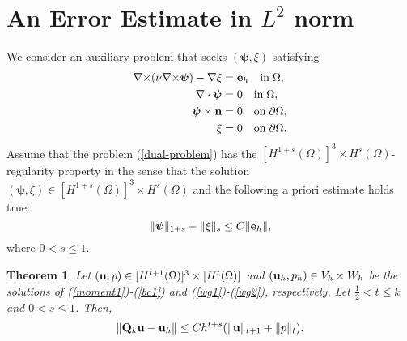 \documentclass[11pt]{amsart}
\newtheorem{theorem}{Theorem}[section]
\newcommand{\bu}{{\bf u}}
\newcommand{\be}{{\bf e}}
\newcommand{\bQ}{{\bf Q}}
\newcommand{\curl}{{\nabla\times}}
\def\bpsi{{\boldsymbol{\psi}}}
\def\bn{{\bf n}}
\begin{document}
\section{An Error Estimate in $L^2$ norm}\label{Section:L2ErrorEstimates}

We consider an auxiliary problem that seeks
$(\bpsi,\xi)$ satisfying
\begin{equation}\label{dual-problem}
\begin{split}
\curl(\nu \curl\bpsi)-\nabla \xi &=\be_h\quad \mbox{in}\;\Omega,\\
\nabla\cdot\bpsi&=0\quad\mbox{in}\;\Omega,\\
\bpsi\times\bn &= 0\quad\mbox{on}\;\partial\Omega,\\
\xi &= 0\quad\mbox{on}\;\partial\Omega.\\
\end{split}
\end{equation}
Assume that the problem (\ref{dual-problem}) has the
$[H^{1+s}(\Omega)]^3\times H^s(\Omega)$-regularity property in the
sense that the solution $(\bpsi, \xi)\in [H^{1+s}(\Omega)]^3\times
H^s(\Omega)$ and the following a priori estimate holds true:
\begin{equation}\label{reg}
\|\bpsi\|_{1+s}+\|\xi\|_s\le C\|\be_h\|,
\end{equation}
where $0< s\le 1$.

\medskip
\begin{theorem} \label{L2-bd}
Let $(\bu, p)\in  [H^{t+1}(\Omega)]^3\times [H^{t}(\Omega)]$ and $(\bu_h,p_h)\in V_h\times W_h$ be the
solutions of (\ref{moment1})-(\ref{bc1}) and (\ref{wg1})-(\ref{wg2}),
respectively. Let $\frac12 <t\le k$ and $0 < s \le 1$. Then,
\begin{equation}\label{l2-error}
\|\bQ_k\bu-\bu_h\|\le Ch^{t+s}(\|\bu\|_{t+1}+\|p\|_t).
\end{equation}
\end{theorem}
\end{document}
